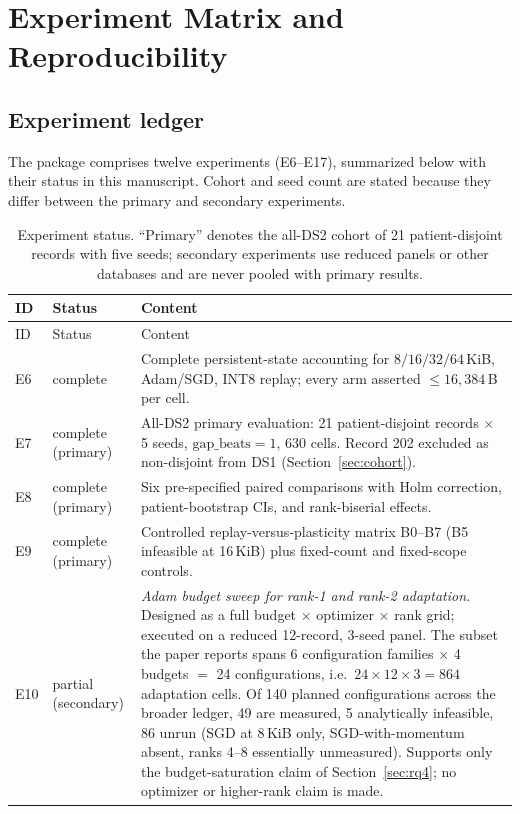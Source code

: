 \section{Experiment Matrix and Reproducibility}
\label{sec:appendix}

\subsection{Experiment ledger}

The package comprises twelve experiments (E6--E17), summarized below with their
status in this manuscript. Cohort and seed count are stated because they differ
between the primary and secondary experiments.

\begingroup
\small
\setlength{\LTcapwidth}{\textwidth}
\begin{longtable}{llp{7.2cm}}
\caption{Experiment status. ``Primary'' denotes the all-DS2 cohort of 21 patient-disjoint records
with five seeds; secondary experiments use reduced panels or other databases and
are never pooled with primary results.}
\label{tab:exp_status}\\
\toprule
ID & Status & Content \\
\midrule
\endfirsthead
\toprule
ID & Status & Content \\
\midrule
\endhead
\bottomrule
\endfoot
E6 & complete & Complete persistent-state accounting for $8/16/32/64$\,KiB, Adam/SGD, INT8 replay; every arm asserted $\le 16{,}384$\,B per cell. \\
E7 & complete (primary) & All-DS2 primary evaluation: 21 patient-disjoint records $\times$ 5 seeds, $\mathrm{gap\_beats}=1$, 630 cells. Record 202 excluded as non-disjoint from DS1 (Section~\ref{sec:cohort}). \\
E8 & complete (primary) & Six pre-specified paired comparisons with Holm correction, patient-bootstrap CIs, and rank-biserial effects. \\
E9 & complete (primary) & Controlled replay-versus-plasticity matrix B0--B7 (B5 infeasible at 16\,KiB) plus fixed-count and fixed-scope controls. \\
E10 & partial (secondary) & \emph{Adam budget sweep for rank-1 and rank-2 adaptation.} Designed as a full budget $\times$ optimizer $\times$ rank grid; executed on a reduced 12-record, 3-seed panel. The subset the paper reports spans 6 configuration families $\times$ 4 budgets $=$ 24 configurations, i.e.\ $24 \times 12 \times 3 = 864$ adaptation cells. Of 140 planned configurations across the broader ledger, 49 are measured, 5 analytically infeasible, 86 unrun (SGD at 8\,KiB only, SGD-with-momentum absent, ranks 4--8 essentially unmeasured). Supports only the budget-saturation claim of Section~\ref{sec:rq4}; no optimizer or higher-rank claim is made. \\

\end{longtable}
